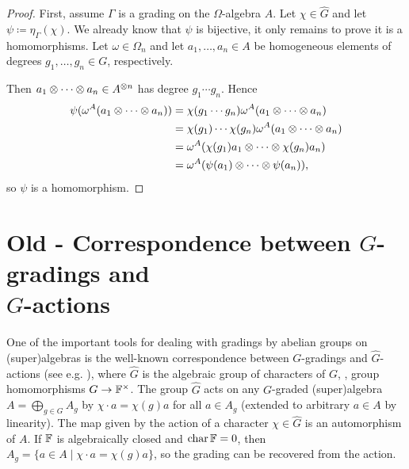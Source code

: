 \begin{proof}
    First, assume $\Gamma$ is a grading on the $\Omega$-algebra $A$.
    Let $\chi \in \widehat G$ and let $\psi \coloneqq \eta_\Gamma(\chi)$. 
    We already know that $\psi$ is bijective, it only remains to prove it is a homomorphisms. 
    Let $\omega \in \Omega_n$ and let $a_1, \ldots, a_n \in A$ be homogeneous elements of degrees $g_1, \ldots, g_n \in G$, respectively.
    
    Then $a_1\otimes \cdots \otimes a_n \in A^{\otimes n}$ has degree $g_1 \cdots g_n$. Hence
    \begin{align*}
        \psi(\omega^A(a_1\otimes \cdots \otimes a_n)) &= \chi(g_1 \cdots g_n) \omega^A(a_1\otimes \cdots \otimes a_n)\\
        &=\chi(g_1) \cdots \chi(g_n) \omega^A(a_1\otimes \cdots \otimes a_n)\\
        &= \omega^A(\chi(g_1)a_1\otimes \cdots \otimes \chi(g_n)a_n)\\
        &= \omega^A(\psi(a_1)\otimes \cdots \otimes \psi(a_n)),
    \end{align*}
    so $\psi$ is a homomorphism.
\end{proof}



\section{Old - Correspondence between $G$-gradings and\\ $\widehat G$-actions}\label{ssec:G-hat-action}

One of the important tools for dealing with gradings by abelian groups on (super)algebras is the well-known correspondence between  $G$-gradings and $\widehat G$-actions (see e.g. \cite[\S 1.4]{livromicha}), where $\widehat G$ is the algebraic group of characters of $G$, \ie, group homomorphisms $G \rightarrow \mathbb{F}^{\times}$. The group $\widehat{G}$ acts on any $G$-graded (super)algebra $A = \bigoplus_{g\in G} A_g$ by $\chi \cdot a = \chi(g) a$ for all $a\in A_g$ (extended to arbitrary $a\in A$ by linearity). The map given by the action of a character $\chi \in \widehat{G}$ is an automorphism of $A$. If $\mathbb{F}$ is algebraically closed and $\operatorname{char} \mathbb{F} = 0$, then $A_g = \{ a\in A \mid \chi \cdot a = \chi (g) a\}$, so the grading can be recovered from the action.


